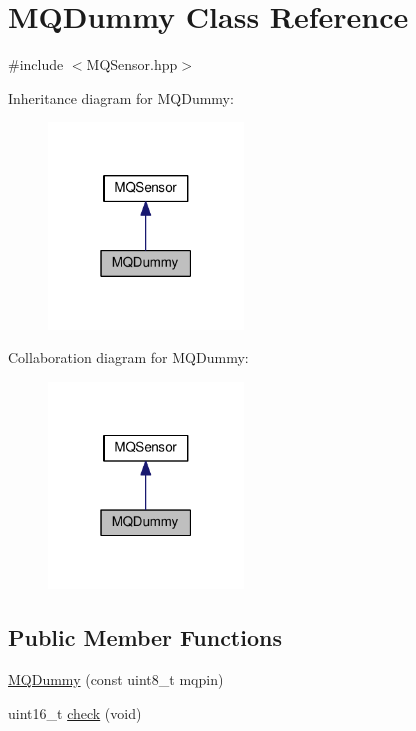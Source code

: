 \hypertarget{class_m_q_dummy}{}\section{M\+Q\+Dummy Class Reference}
\label{class_m_q_dummy}


{\ttfamily \#include $<$M\+Q\+Sensor.\+hpp$>$}



Inheritance diagram for M\+Q\+Dummy\+:\nopagebreak
\begin{figure}[H]
\begin{center}
\leavevmode
\includegraphics[width=147pt]{class_m_q_dummy__inherit__graph}
\end{center}
\end{figure}


Collaboration diagram for M\+Q\+Dummy\+:\nopagebreak
\begin{figure}[H]
\begin{center}
\leavevmode
\includegraphics[width=147pt]{class_m_q_dummy__coll__graph}
\end{center}
\end{figure}
\subsection*{Public Member Functions}
\begin{DoxyCompactItemize}
\item 
\hyperlink{class_m_q_dummy_acd45bbb9678e3578b0600ecaa74f0120}{M\+Q\+Dummy} (const uint8\+\_\+t mqpin)
\item 
uint16\+\_\+t \hyperlink{class_m_q_dummy_a36c209a1aae7acd690da607677a90181}{check} (void)
\end{DoxyCompactItemize}
